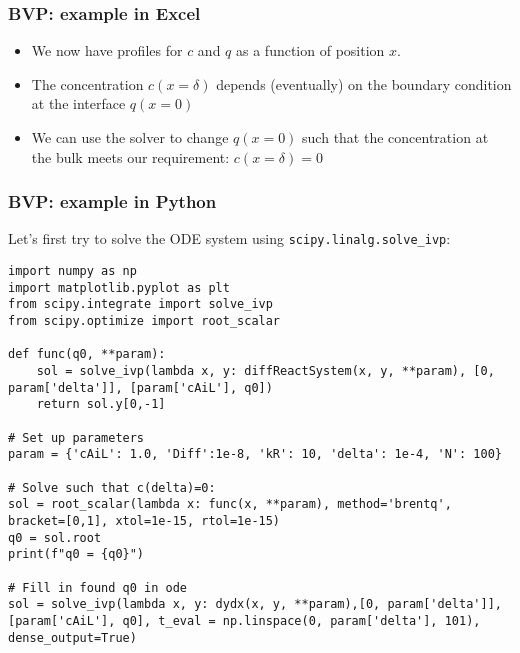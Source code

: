 \begin{frame}
  \frametitle{BVP: example in Excel}  
  \begin{itemize}
    \item We now have profiles for $c$ and $q$ as a function of position $x$.
    \item The concentration $c(x=\delta)$ depends (eventually) on the boundary condition at the interface $q(x=0)$
    \item We can use the solver to change $q(x=0)$ such that the concentration at the bulk meets our requirement: $c(x=\delta)=0$
  \end{itemize}

\end{frame}


\begin{frame}[fragile,label={diffReactODEtrial}]
  \frametitle{BVP: example in Python}
  Let's first try to solve the ODE system using \lstinline$scipy.linalg.solve_ivp$:
  \begin{lstlisting}
import numpy as np
import matplotlib.pyplot as plt
from scipy.integrate import solve_ivp
from scipy.optimize import root_scalar

def func(q0, **param):
    sol = solve_ivp(lambda x, y: diffReactSystem(x, y, **param), [0, param['delta']], [param['cAiL'], q0])
    return sol.y[0,-1]

# Set up parameters
param = {'cAiL': 1.0, 'Diff':1e-8, 'kR': 10, 'delta': 1e-4, 'N': 100}

# Solve such that c(delta)=0:
sol = root_scalar(lambda x: func(x, **param), method='brentq', bracket=[0,1], xtol=1e-15, rtol=1e-15)
q0 = sol.root
print(f"q0 = {q0}")

# Fill in found q0 in ode
sol = solve_ivp(lambda x, y: dydx(x, y, **param),[0, param['delta']], [param['cAiL'], q0], t_eval = np.linspace(0, param['delta'], 101), dense_output=True)    
  \end{lstlisting}
\end{frame}

